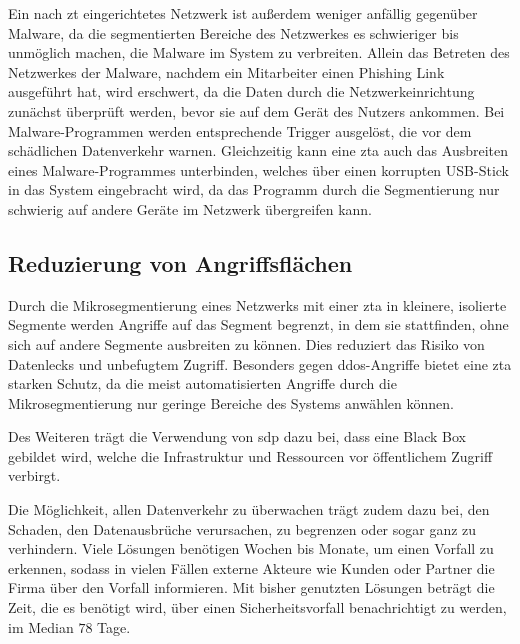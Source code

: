 Ein nach \ac{zt} eingerichtetes Netzwerk ist außerdem weniger anfällig gegenüber Malware, da die segmentierten Bereiche des Netzwerkes es schwieriger bis unmöglich machen, die Malware im System zu verbreiten.
Allein das Betreten des Netzwerkes der Malware, nachdem \zb ein Mitarbeiter einen Phishing Link ausgeführt hat, wird erschwert, da die Daten durch die Netzwerkeinrichtung zunächst überprüft werden, bevor sie auf dem Gerät des Nutzers ankommen.\autocite[\vglf][]{cunningham-2019}
Bei Malware-Programmen werden entsprechende Trigger ausgelöst, die vor dem schädlichen Datenverkehr warnen.\autocite[\vglf][]{cunningham-2019}
Gleichzeitig kann eine \ac{zta} auch das Ausbreiten eines Malware-Programmes unterbinden, welches \zb über einen korrupten USB-Stick in das System eingebracht wird, da das Programm durch die Segmentierung nur schwierig auf andere Geräte im Netzwerk übergreifen kann.\autocite[\vglf][]{cunningham-2019}

\subsection{Reduzierung von Angriffsflächen}\label{subsec:reduzierung-von-angriffsflachen}
Durch die Mikrosegmentierung eines Netzwerks mit einer \ac{zta} in kleinere, isolierte Segmente werden Angriffe auf das Segment begrenzt, in dem sie stattfinden, ohne sich auf andere Segmente ausbreiten zu können.
Dies reduziert das Risiko von Datenlecks und unbefugtem Zugriff.\autocites[\vglf][]{shore-2021}[\vglf][]{buck-2021}
Besonders gegen \ac{ddos}-Angriffe bietet eine \ac{zta} starken Schutz, da die meist automatisierten Angriffe durch die Mikrosegmentierung nur geringe Bereiche des Systems anwählen können.\autocite[\vglf][]{Eidle-2017}

Des Weiteren trägt die Verwendung von \ac{sdp} dazu bei, dass eine Black Box gebildet wird, welche die Infrastruktur und Ressourcen vor öffentlichem Zugriff verbirgt.\autocites[\vglf][]{buck-2021}[\vglf][]{kumar-2019}

Die Möglichkeit, allen Datenverkehr zu überwachen trägt zudem dazu bei, den Schaden, den Datenausbrüche verursachen, zu begrenzen oder sogar ganz zu verhindern.\autocite[\vglf][]{cunningham-2019}
Viele Lösungen benötigen Wochen bis Monate, um einen Vorfall zu erkennen, sodass in vielen Fällen externe Akteure wie Kunden oder Partner die Firma über den Vorfall informieren.\autocite[\vglf][]{cunningham-2019}
Mit bisher genutzten Lösungen beträgt die Zeit, die es benötigt wird, über einen Sicherheitsvorfall benachrichtigt zu werden, im Median $78$ Tage.\autocite[\vglf][]{fireeye-2019}

